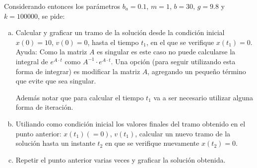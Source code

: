 \documentclass{article}
\begin{document}
Considerando entonces los parámetros $b_{a} = 0.1$, $m=1$, $b=30$, $g=9.8$ y $k = 100000$, se pide:
\begin{enumerate}[a)]
\item Calcular y graficar un tramo de la solución desde la condición inicial $x(0)=10$, $v(0)=0$, hasta el tiempo $t_{1}$, en el que se verifique $x(t_{1})=0$.
Ayuda: Como la matriz $A$ es singular es este caso no puede calcularse la integral de $e^{A \cdot t}$ como $A^{-1} \cdot e^{A \cdot t}$. Una opción (para seguir utilizando esta forma de integrar) es modificar la matriz $A$, agregando un pequeño término que evite que sea singular.

Además notar que para calcular el tiempo $t_{1}$ va a ser necesario utilizar alguna forma de iteración.

\item Utiliando como condición inicial los valores finales del tramo obtenido en el punto anterior: $x(t_{1})(=0)$, $v(t_{1})$, calcular un nuevo tramo de la solución hasta un instante $t_{2}$ en que se verifique nuevamente $x(t_{2})=0$.

\item Repetir el punto anterior varias veces y graficar la solución obtenida.
\end{enumerate}
\end{document}
